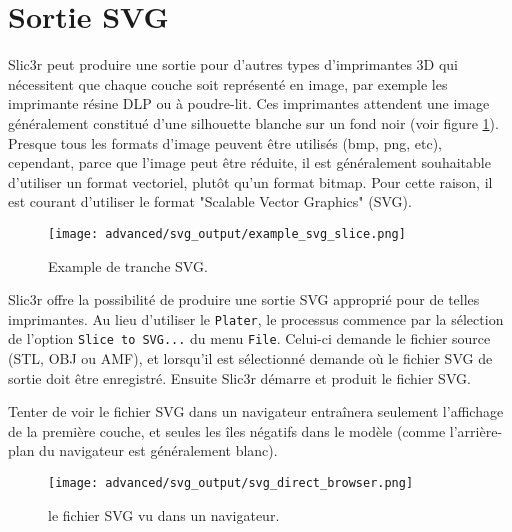 
\section{Sortie SVG} %
\label{sec:svg_output}

Slic3r peut produire une sortie pour d'autres types d'imprimantes 3D qui n\'ecessitent que chaque couche soit repr\'esent\'e en image, par exemple les imprimante r\'esine DLP ou \`a poudre-lit. Ces imprimantes attendent une image g\'en\'eralement constitu\'e d'une silhouette blanche sur un fond noir (voir figure \ref{fig:example_svg_slice}).  Presque tous les formats d'image peuvent \^etre utilis\'es (bmp, png, etc), cependant, parce que l'image peut \^etre r\'eduite, il est g\'en\'eralement souhaitable d'utiliser un format vectoriel, plut\^ot qu'un format bitmap. Pour cette raison, il est courant d'utiliser le format "Scalable Vector Graphics" (SVG).

\begin{figure}[H]
\centering
\texttt{[image: advanced/svg\_output/example\_svg\_slice.png]}
\caption{Example de tranche SVG.}
\label{fig:example_svg_slice}
\end{figure}


Slic3r offre la possibilit\'e de produire une sortie SVG appropri\'e pour de telles imprimantes.  Au lieu d'utiliser le \texttt{Plater}, le processus commence par la s\'election de l'option \texttt{Slice to SVG...} du menu \texttt{File}.  Celui-ci demande le fichier source (STL, OBJ ou AMF), et lorsqu'il est s\'electionn\'e demande o\`u le fichier SVG de sortie doit \^etre enregistr\'e. Ensuite Slic3r d\'emarre et produit le fichier SVG.

Tenter de voir le fichier SVG dans un navigateur entra\^inera seulement l'affichage de la premi\`ere couche, et seules les \^iles n\'egatifs dans le mod\`ele (comme l'arri\`ere-plan du navigateur est g\'en\'eralement blanc).

\begin{figure}[H]
\centering
\texttt{[image: advanced/svg\_output/svg\_direct\_browser.png]}
\caption{le fichier SVG vu dans un navigateur.}
\label{fig:svg_direct_browser}
\end{figure}

